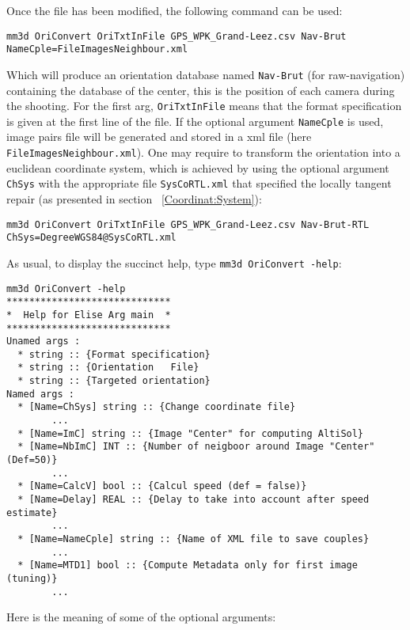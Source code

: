 Once the file has been modified, the following command can be used:

\begin{verbatim}
mm3d OriConvert OriTxtInFile GPS_WPK_Grand-Leez.csv Nav-Brut NameCple=FileImagesNeighbour.xml
\end{verbatim}

Which will produce an orientation database named {\tt Nav-Brut} (for raw-navigation) containing the database of the center, this is the position of each camera during the shooting. For the first arg, {\tt OriTxtInFile} means that the format specification is given at the first line of the file. If the optional argument {\tt NameCple} is used, image pairs file will be generated and stored in a xml file (here {\tt FileImagesNeighbour.xml}).
One may require to transform the orientation into a euclidean coordinate system, which is achieved by using the optional argument {\tt ChSys} with the appropriate file {\tt SysCoRTL.xml} that specified the locally tangent repair (as presented in section ~\ref{Coordinat:System}):

\begin{verbatim}
mm3d OriConvert OriTxtInFile GPS_WPK_Grand-Leez.csv Nav-Brut-RTL ChSys=DegreeWGS84@SysCoRTL.xml
\end{verbatim}

As usual, to display the succinct help, type {\tt mm3d OriConvert -help}:

\begin{verbatim}
mm3d OriConvert -help
*****************************
*  Help for Elise Arg main  *
*****************************
Unamed args :
  * string :: {Format specification}
  * string :: {Orientation   File}
  * string :: {Targeted orientation}
Named args :
  * [Name=ChSys] string :: {Change coordinate file}
        ...
  * [Name=ImC] string :: {Image "Center" for computing AltiSol}
  * [Name=NbImC] INT :: {Number of neigboor around Image "Center" (Def=50)}
        ...
  * [Name=CalcV] bool :: {Calcul speed (def = false)}
  * [Name=Delay] REAL :: {Delay to take into account after speed estimate}
        ...
  * [Name=NameCple] string :: {Name of XML file to save couples}
        ...
  * [Name=MTD1] bool :: {Compute Metadata only for first image (tuning)}
        ...
\end{verbatim}

Here is the meaning of some of the optional arguments:

